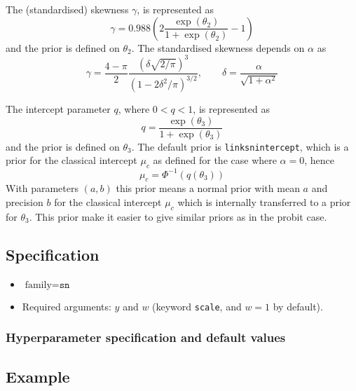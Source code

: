 \documentclass[a4paper,11pt]{article}
\begin{document}
The (standardised) skewness $\gamma$, is represented as
\begin{displaymath}
    \gamma=0.988 (2\frac{\exp(\theta_2)}{1+\exp(\theta_2)}-1)
\end{displaymath}
and the prior is defined on $\theta_{2}$. The standardised skewness
depends on $\alpha$ as
\begin{displaymath}
\gamma ={\frac  {4-\pi }{2}}{\frac{\left(\delta {\sqrt  {2/\pi
              }}\right)^{3}}{\left(1-2\delta^{2}/\pi
        \right)^{{3/2}}}}, \qquad
    \delta ={\frac{\alpha}{{\sqrt{1+\alpha^{2}}}}}
\end{displaymath}

The intercept parameter $q$, where $0<q<1$, is represented as
\begin{displaymath}
    q=\frac{\exp(\theta_3)}{1+\exp(\theta_3)}
\end{displaymath}
and the prior is defined on $\theta_3$.
The default prior is \texttt{linksnintercept}, which is a prior for
the classical intercept $\mu_c$ as defined
for the case where $\alpha=0$, hence
\begin{displaymath}
    \mu_c =  \Phi^{-1}(q(\theta_3))
\end{displaymath}
With parameters $(a,b)$ this prior means a normal prior with mean $a$
and precision $b$ for the classical intercept $\mu_c$ which is
internally transferred to a prior for $\theta_3$. This prior make it
easier to give similar priors as in the probit case.


\subsection*{Specification}

\begin{itemize}
\item $\text{family}=\texttt{sn}$
\item Required arguments: $y$ and $w$ (keyword \texttt{scale}, and 
    $w=1$ by default).
\end{itemize}

\subsubsection*{Hyperparameter specification and default values}



\subsection*{Example}
\end{document}
